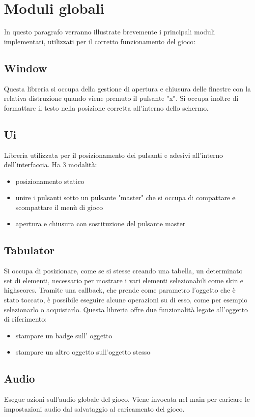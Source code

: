 \documentclass[12pt]{article}
\begin{document}
\section{Moduli globali}
In questo paragrafo verranno illustrate brevemente i principali moduli implementati, utilizzati per il corretto funzionamento del gioco:
\\
\subsection{Window}
Questa libreria si occupa della gestione di apertura e chiusura delle finestre con la relativa distruzione quando viene premuto il pulsante "x". Si occupa inoltre di formattare il testo nella posizione corretta all'interno dello schermo.
\subsection{Ui}
Libreria utilizzata per il posizionamento dei pulsanti e adesivi all'interno dell'interfaccia. Ha 3 modalità:
            \begin{itemize}
                \item posizionamento statico 
                \item unire i pulsanti sotto un pulsante "master" che si occupa di compattare e scompattare il menù di gioco
                \item apertura e chiusura con sostituzione del pulsante master
            \end{itemize}
\subsection{Tabulator} 
Si occupa di posizionare, come se si stesse creando una tabella, un determinato set di elementi, necessario per mostrare i vari elementi selezionabili come skin e highscores. Tramite una callback, che prende come parametro l'oggetto che è stato toccato, è possibile eseguire alcune operazioni su di esso, come per esempio selezionarlo o acquistarlo. Questa libreria offre due funzionalità legate all'oggetto di riferimento:
        \begin{itemize}
            \item stampare un badge sull’ oggetto
            \item stampare un altro oggetto sull'oggetto stesso
        \end{itemize}
\subsection{Audio} 
Esegue azioni sull'audio globale del gioco. Viene invocata nel main per caricare le impostazioni audio dal salvataggio al caricamento del gioco.
\end{document}
